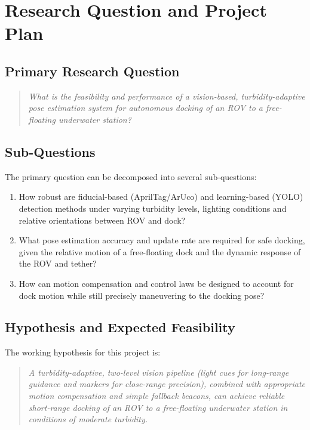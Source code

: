 \section{Research Question and Project Plan} \label{sec:research-question}

\subsection{Primary Research Question}

\begin{quote}
    \emph{What is the feasibility and performance of a vision-based, turbidity-adaptive pose estimation system for autonomous docking of an ROV to a free-floating underwater station?}
\end{quote}

\subsection{Sub-Questions}

The primary question can be decomposed into several sub-questions:

\begin{enumerate}
    \item How robust are fiducial-based (AprilTag/ArUco) and learning-based (YOLO) detection methods under varying turbidity levels, lighting conditions and relative orientations between ROV and dock?
    \item What pose estimation accuracy and update rate are required for safe docking, given the relative motion of a free-floating dock and the dynamic response of the ROV and tether?
    \item How can motion compensation and control laws be designed to account for dock motion while still precisely maneuvering to the docking pose?
\end{enumerate}

\subsection{Hypothesis and Expected Feasibility}

The working hypothesis for this project is:

\begin{quote}
    \emph{A turbidity-adaptive, two-level vision pipeline (light cues for long-range guidance and markers for close-range precision), combined with appropriate motion compensation and simple fallback beacons, can achieve reliable short-range docking of an ROV to a free-floating underwater station in conditions of moderate turbidity.}
\end{quote}

